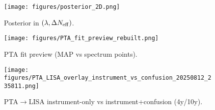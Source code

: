 \documentclass[reprint,aps,prl,showkeys,amsmath,amssymb,floatfix]{revtex4-2}
\begin{document}
\begin{figure}[t]
  \centering
  \texttt{[image: figures/posterior\_2D.png]}
  \caption{Posterior in $(\lambda,\Delta N_{\rm eff})$.}
\end{figure}

\begin{figure}[t]
  \centering
  \texttt{[image: figures/PTA\_fit\_preview\_rebuilt.png]}
  \caption{PTA fit preview (MAP vs spectrum points).}
\end{figure}

\begin{figure}[t]
  \centering
  \texttt{[image: figures/PTA\_LISA\_overlay\_instrument\_vs\_confusion\_20250812\_235811.png]}
  \caption{PTA$\to$LISA instrument-only vs instrument+confusion (4y/10y).}
\end{figure}



\end{document}
